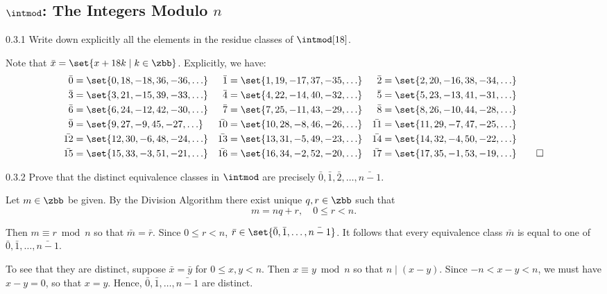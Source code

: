 \subsection{\texorpdfstring{$\intmod$: The Integers Modulo $n$}{Z/nZ: The Integers Modulo n}}

\begin{exercise}{0.3.1}
    Write down explicitly all the elements in the residue classes of $\intmod[18]$.
\end{exercise}

\begin{sol}
    Note that $\bar x = \set{x + 18k \mid k \in \zbb}$.
	Explicitly, we have:
    \begin{align*}
        \bar 0 & = \set{0, 18, -18, 36, -36, \ldots} & \bar 1 & = \set{1, 19, -17, 37, -35, \ldots} & \bar 2 & = \set{2, 20, -16, 38, -34, \ldots} \\
        \bar 3 & = \set{3, 21, -15, 39, -33, \ldots} & \bar 4 & = \set{4, 22, -14, 40, -32, \ldots} & \bar 5 & = \set{5, 23, -13, 41, -31, \ldots} \\
        \bar 6 & = \set{6, 24, -12, 42, -30, \ldots} & \bar 7 & = \set{7, 25, -11, 43, -29, \ldots} & \bar 8 & = \set{8, 26, -10, 44, -28, \ldots} \\
        \bar 9 & = \set{9, 27, -9, 45, -27, \ldots} & \bar{10} & = \set{10, 28, -8, 46, -26, \ldots} & \bar{11} & = \set{11, 29, -7, 47, -25, \ldots} \\
        \bar{12} & = \set{12, 30, -6, 48, -24, \ldots} & \bar{13} & = \set{13, 31, -5, 49, -23, \ldots} & \bar{14} & = \set{14, 32, -4, 50, -22, \ldots} \\
        \bar{15} & = \set{15, 33, -3, 51, -21, \ldots} & \bar{16} & = \set{16, 34, -2, 52, -20, \ldots} & \bar{17} & = \set{17, 35, -1, 53, -19, \ldots} \qedhere
    \end{align*}
\end{sol}

\begin{exercise}{0.3.2}
    Prove that the distinct equivalence classes in $\intmod$ are precisely $\bar 0, \bar 1, \bar 2, \ldots, \bar{n - 1}$.

\end{exercise}

\begin{sol}
    Let $m \in \zbb$ be given.
    By the Division Algorithm there exist unique $q, r \in \zbb$ such that
    \[
        m = nq + r, \quad 0 \leq r < n.
    \]

    Then $m \equiv r \bmod n$ so that $\bar m = \bar r$. Since $0 \leq r < n$, $\bar r \in \set{\bar 0, \bar 1, \ldots, \bar{n - 1}}$.
    It follows that every equivalence class $\bar m$ is equal to one of $\bar 0, \bar 1, \ldots, \bar{n - 1}$.
    
    To see that they are distinct, suppose $\bar x = \bar y$ for $0 \leq x, y < n$.
    Then $x \equiv y \bmod n$ so that $n \mid (x - y)$.
    Since $-n < x - y < n$, we must have $x - y = 0$, so that $x = y$.
    Hence, $\bar 0, \bar 1, \ldots, \bar{n - 1}$ are distinct.
\end{sol}

